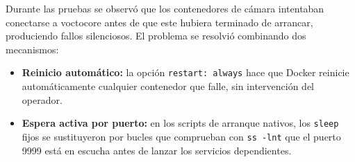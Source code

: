 Durante las pruebas se observó que los contenedores de cámara intentaban conectarse a
voctocore antes de que este hubiera terminado de arrancar, produciendo fallos silenciosos.
El problema se resolvió combinando dos mecanismos:

\begin{itemize}
  \item \textbf{Reinicio automático:} la opción \texttt{restart: always} hace que Docker
        reinicie automáticamente cualquier contenedor que falle, sin intervención del
        operador.
  \item \textbf{Espera activa por puerto:} en los scripts de arranque nativos, los
        \texttt{sleep} fijos se sustituyeron por bucles que comprueban con
        \texttt{ss -lnt} que el puerto 9999 está en escucha antes de lanzar los
        servicios dependientes.
\end{itemize}
